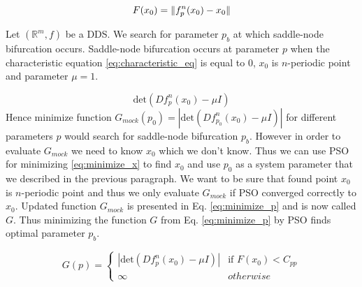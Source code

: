 \begin{equation}
\label{eq:minimize_x}
    F(x_0) = \lVert f^{n}_{p}(x_0)-x_0\rVert
\end{equation}

\par
Let $(\mathbb{R}^{m}, f)$ be a DDS.
We search for parameter $p_b$ at which saddle-node bifurcation occurs.
Saddle-node bifurcation occurs at parameter $p$ when the characteristic equation \ref{eq:characteristic_eq} is equal to $0$, $x_0$ is $n$-periodic point and parameter $\mu = 1$.

\begin{equation}
\label{eq:characteristic_eq}
        \text{det}(Df^{n}_{p}(x_0)-\mu I)
\end{equation}
Hence minimize function $G_{mock}(p_0) = |\text{det}(Df^{n}_{p_0}(x_0)-\mu I)|$ for different parameters $p$ would search for saddle-node bifurcation $p_b$.
However in order to evaluate $G_{mock}$ we need to know $x_0$ which we don't know.
Thus we can use PSO for minimizing \ref{eq:minimize_x} to find $x_0$ and use $p_0$ as a system parameter that we described in the previous paragraph.
We want to be sure that found point $x_0$ is $n$-periodic point and thus we only evaluate $G_{mock}$ if PSO converged correctly to $x_0$.
Updated function $G_{mock}$ is presented in Eq. \ref{eq:minimize_p} and is now called $G$.
Thus minimizing the function $G$ from Eq. \ref{eq:minimize_p} by PSO finds optimal parameter $p_b$.

\begin{equation}
\label{eq:minimize_p}
    G(p) =
    \begin{cases}
        |\text{det}(Df^{n}_{p}(x_0)-\mu I)| & \text{if } F(x_0) < C_{pp} \\
        \infty & otherwise
    \end{cases}
\end{equation}

